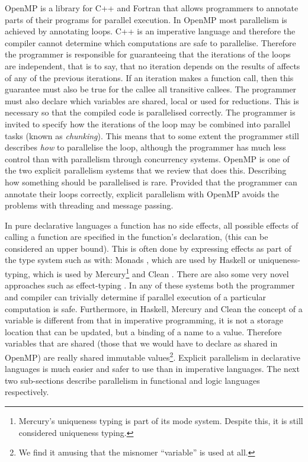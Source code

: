 OpenMP \citep{openmp} is a library for C++ \citep{cplusplus} and Fortran
that allows programmers to annotate parts of their programs for parallel
execution.
In OpenMP most parallelism is achieved by annotating loops.
C++ is an imperative language and therefore the compiler cannot determine
which computations are safe to parallelise.
Therefore the programmer is responsible for guaranteeing that the iterations
of the loops are independent,
that is to say, that no iteration depends on the results of affects of any of
the previous iterations.
If an iteration makes a function call, then this guarantee must also be true for
the callee all transitive callees.
The programmer must also declare which variables are shared, local or used
for reductions.
This is necessary so that the compiled code is parallelised correctly.
The programmer is invited to specify how the iterations of the loop may be
combined into parallel tasks (known as \emph{chunking}).
This means that to some extent the programmer still describes \emph{how} to
parallelise the loop,
although the programmer has much less control than with parallelism through
concurrency systems.
OpenMP is one of the two explicit parallelism systems that we review that
does this.
Describing how something should be parallelised is rare.
Provided that the programmer can annotate their loops correctly,
explicit parallelism with OpenMP avoids the problems
with threading and message passing.  

In pure declarative languages
a function has no side effects,
all possible effects of calling a function are specified in the function's
declaration, (this can be considered an upper bound).
This is often done by expressing effects as part of the type system such as
with:
Monads \citep{haskell-monads}, which are used by Haskell \citep{haskell98}
or
uniqueness-typing, which is used by 
Mercury\footnote{
    Mercury's uniqueness typing is part of its mode system.
    Despite this, it is still considered uniqueness typing.}
\citep{mercury_jlp}
and Clean \citep{brus:1987:clean}.
There are also some very novel approaches such as effect-typing \citep{ddc}.
In any of these systems both the programmer and compiler can trivially
determine if parallel execution of a particular computation is safe.
Furthermore,
in Haskell, Mercury and Clean
the concept of a variable is different from that in imperative programming,
it is not a storage location that can be updated,
but a binding of a name to a value.
Therefore variables that are shared
(those that we would have to declare as shared in OpenMP)
are really shared immutable values\footnote{
    We find it amusing that the misnomer ``variable'' is used at all.}.
Explicit parallelism in declarative languages is much easier and safer to use
than in imperative languages.
The next two sub-sections describe parallelism in functional and logic
languages respectively.

